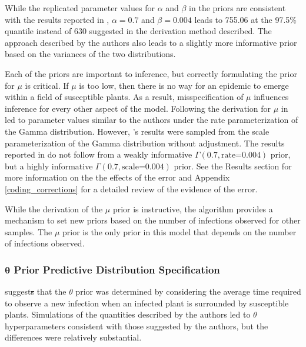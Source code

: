 \documentclass{uwstat572}
\newcommand{\vmdel}[1]{\sout{#1}}
\begin{document}
While the replicated parameter values for $\alpha$ and $\beta$ in the priors are consistent with the results reported in \citep{Brown}, $\alpha=0.7$ and $\beta=0.004$ leads to 755.06 at the 97.5\% quantile instead of 630 suggested in the derivation method described. 
The approach described by the authors also leads to a slightly more informative prior based on the variances of the two distributions. 

Each of the priors are important to inference, but correctly formulating the prior for $\mu$ is critical. 
If $\mu$ is too low, then there is no way for an epidemic to emerge within a field of susceptible plants. 
As a result, misspecification of $\mu$ influences inference for every other aspect of the model. 
Following the derivation for $\mu$ in \citet{Brown} led to parameter values similar to the authors under the rate parameterization of the Gamma distribution. 
However, \citep{Brown}'s results were sampled from the scale parameterization of the Gamma distribution without adjustment.
The results reported in \citet{Brown} do not follow from a weakly informative $\Gamma(0.7, \text{rate=}0.004)$ prior, but a highly informative $\Gamma(0.7, \text{scale=}0.004)$ prior. 
See the Results section for more information on the the effects of the error and Appendix \ref{coding_corrections} for a detailed review of the evidence of the error.  

While the derivation of the $\mu$ prior is instructive, the algorithm provides a mechanism to set new priors based on the number of infections observed for other samples. 
The $\mu$ prior is the only prior in this model that depends on the number of infections observed. 

\subsubsection{$\boldsymbol{\theta}$ Prior Predictive Distribution Specification}
\citet{Brown} suggest\vmdel{s} that the $\theta$ prior was determined by considering the average time required to observe a new infection when an infected plant is surrounded by susceptible plants. 
Simulations of the quantities described by the authors led to $\theta$ hyperparameters consistent with those suggested by the authors, but the differences were relatively substantial.
\end{document}
